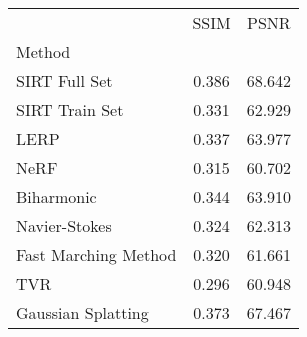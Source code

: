 \begin{tabular}{|l|c|c|}
\toprule
 & SSIM & PSNR \\
Method &  &  \\
\midrule
SIRT Full Set & 0.386 & 68.642 \\
SIRT Train Set & 0.331 & 62.929 \\
LERP & \cellcolor{rankthird}0.337 & \cellcolor{ranksecond}63.977 \\
NeRF & 0.315 & \cellcolor{rankworst}60.702 \\
Biharmonic & \cellcolor{ranksecond}0.344 & \cellcolor{rankthird}63.910 \\
Navier-Stokes & 0.324 & 62.313 \\
Fast Marching Method & 0.320 & 61.661 \\
TVR & \cellcolor{rankworst}0.296 & 60.948 \\
Gaussian Splatting & \cellcolor{rankfirst}0.373 & \cellcolor{rankfirst}67.467 \\
\bottomrule
\end{tabular}
